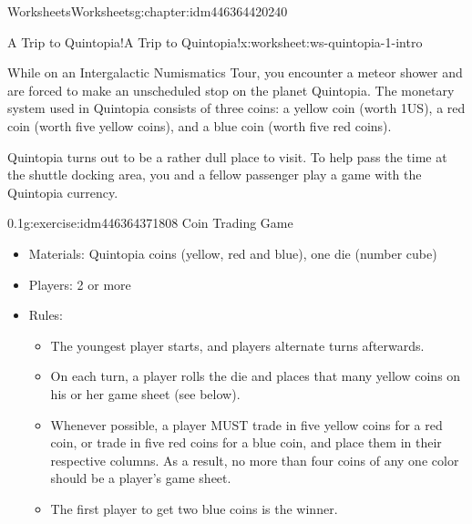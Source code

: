 \documentclass[twoside,11pt,]{book}
\begin{document}
\begin{chapterptx}{Worksheets}{}{Worksheets}{}{}{g:chapter:idm446364420240}
%
%
\typeout{************************************************}
\typeout{************************************************}
%
\begin{worksheet-section-numberless}{A Trip to Quintopia!}{}{A Trip to Quintopia!}{}{}{x:worksheet:ws-quintopia-1-intro}
\begin{introduction}{}%
While on an Intergalactic Numismatics Tour, you encounter a meteor shower and are forced to make an unscheduled stop on the planet Quintopia.  The monetary system used in Quintopia consists of three coins:  a yellow coin (worth \textdollar{}1US), a red coin (worth five yellow coins), and a blue coin (worth five red coins).%
\par
Quintopia turns out to be a rather dull place to visit.  To help pass the time at the shuttle docking area, you and a fellow passenger play a game with the Quintopia currency.%
\end{introduction}%
\begin{divisionexercise}{1}{}{0.1}{g:exercise:idm446364371808}%
Coin Trading Game%
%
\begin{itemize}[label=\textbullet]
\item{}Materials:  Quintopia coins (yellow, red and blue), one die (number cube)%
\item{}Players:  2 or more%
\item{}Rules:%
\begin{itemize}[label=$\circ$]
\item{}The youngest player starts, and players alternate turns afterwards.%
\item{}On each turn, a player rolls the die and places that many yellow coins on his or her game sheet (see below).%
\item{}Whenever possible, a player MUST trade in five yellow coins for a red coin, or trade in five red coins for a blue coin, and place them in their respective columns.  As a result, no more than four coins of any one color should be a player’s game sheet.%
\item{}The first player to get two blue coins is the winner.%
\end{itemize}
%
\end{itemize}
\begin{sidebyside}{1}{0.05}{0.05}{0}%
\begin{sbspanel}{0.9}%

\end{sbspanel}
\end{sidebyside}
\end{divisionexercise}
\end{worksheet-section-numberless}
\end{chapterptx}
\end{document}
